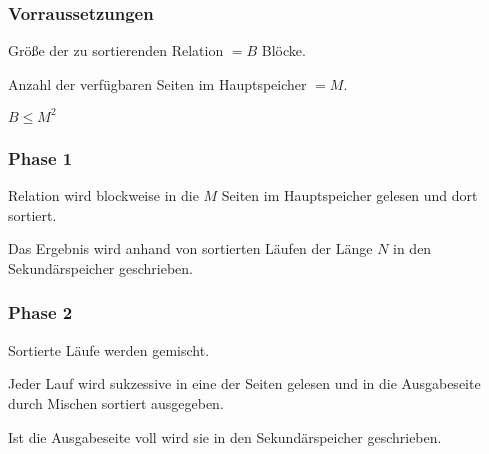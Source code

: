 \documentclass[10pt,a4paper,oneside]{report}
\begin{document}
\subsubsection*{Vorraussetzungen}

Größe der zu sortierenden Relation $= B$ Blöcke.

Anzahl der verfügbaren Seiten im Hauptspeicher $= M$.

$B \leq M^2$

\subsubsection*{Phase 1}

Relation wird blockweise in die $M$ Seiten im Hauptspeicher gelesen und dort sortiert.

Das Ergebnis wird anhand von sortierten Läufen der Länge $N$ in den Sekundärspeicher geschrieben.

\subsubsection*{Phase 2}

Sortierte Läufe werden gemischt.

Jeder Lauf wird sukzessive in eine der Seiten gelesen und in die Ausgabeseite durch Mischen sortiert ausgegeben.

Ist die Ausgabeseite voll wird sie in den Sekundärspeicher geschrieben.
\end{document}
